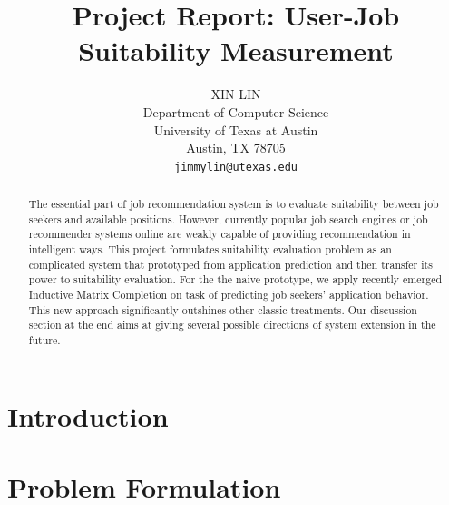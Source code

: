 \documentclass{article} %
\title{Project Report: User-Job Suitability Measurement}
\author{
XIN LIN \\
Department of Computer Science\\
University of Texas at Austin \\
Austin, TX 78705 \\
\texttt{jimmylin@utexas.edu} \\
}
\begin{document}
\maketitle

\begin{abstract}

The essential part of job recommendation system is to evaluate suitability
between job seekers and available positions. However, currently popular job search
engines or job recommender systems online are weakly capable of providing
recommendation in intelligent ways. 
This project formulates suitability
evaluation problem as an complicated system that prototyped from application
prediction and then transfer its power to suitability evaluation. 
For the the naive prototype, we apply recently emerged Inductive Matrix
Completion on task of predicting job seekers' application behavior. This new
approach significantly outshines other classic treatments. 
Our discussion section at the end aims at giving several possible directions
of system extension in the future.
 


\end{abstract}





\section{Introduction}

\section{Problem Formulation}
\end{document}
